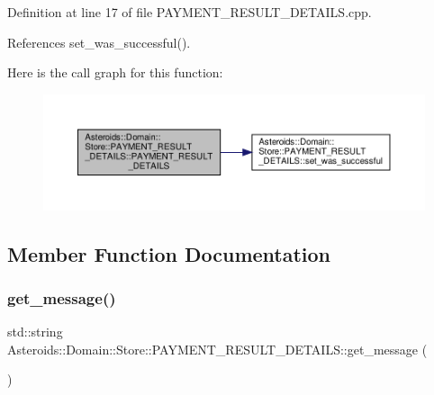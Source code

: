 Definition at line 17 of file P\+A\+Y\+M\+E\+N\+T\+\_\+\+R\+E\+S\+U\+L\+T\+\_\+\+D\+E\+T\+A\+I\+L\+S.\+cpp.



References set\+\_\+was\+\_\+successful().

Here is the call graph for this function\+:\nopagebreak
\begin{figure}[H]
\begin{center}
\leavevmode
\includegraphics[width=350pt]{classAsteroids_1_1Domain_1_1Store_1_1PAYMENT__RESULT__DETAILS_a82b55a89437535aa8b69781dfa122205_cgraph}
\end{center}
\end{figure}


\subsection{Member Function Documentation}
\mbox{\label{classAsteroids_1_1Domain_1_1Store_1_1PAYMENT__RESULT__DETAILS_ab0e02bd3cbd1b221ca1aac3d7a21484f}} 
\subsubsection{\texorpdfstring{get\+\_\+message()}{get\_message()}}
{\footnotesize\ttfamily std\+::string Asteroids\+::\+Domain\+::\+Store\+::\+P\+A\+Y\+M\+E\+N\+T\+\_\+\+R\+E\+S\+U\+L\+T\+\_\+\+D\+E\+T\+A\+I\+L\+S\+::get\+\_\+message (\begin{DoxyParamCaption}{ }\end{DoxyParamCaption})\hspace{0.3cm}{\ttfamily [virtual]}}



